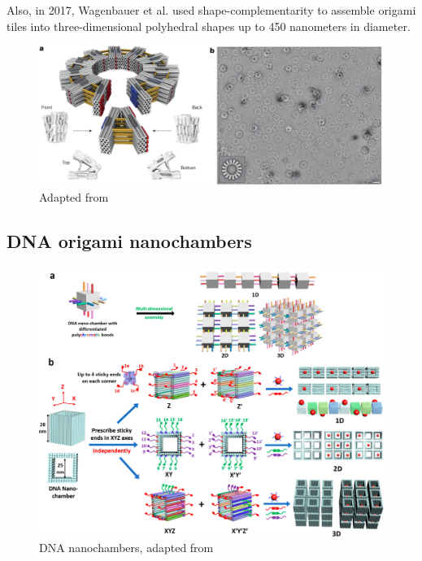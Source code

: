 
Also, in 2017, Wagenbauer et al. \cite{wagenbauer2017gigadalton} used shape-complementarity to assemble origami tiles into three-dimensional polyhedral shapes up to 450 nanometers in diameter.

\begin{figure}[h]
  \centering\includegraphics[width=\textwidth]{figures/dietz_ring.png}
  \caption{Adapted from \cite{wagenbauer2017gigadalton}}
\end{figure}

\cite{sigl2021programmable}


\subsection{DNA origami nanochambers}

\begin{figure}[h]
  \centering\includegraphics[width=\textwidth]{figures/nanochambers2.jpeg}
  \caption{DNA nanochambers, adapted from \cite{nano-chambers_lin2020}}
\end{figure}


